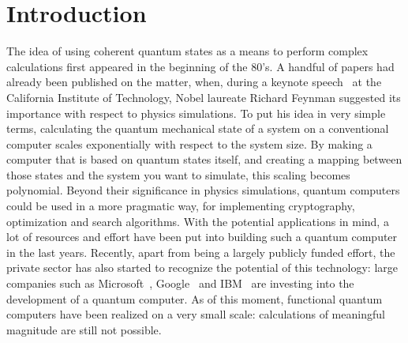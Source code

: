 \chapter{Introduction}

	The idea of using coherent quantum states as a means to perform complex calculations first appeared in the beginning of the 80's.
	A handful of papers had already been published on the matter, when, during a keynote speech~\cite{feynman_simulating_1982} at the California Institute of Technology, Nobel laureate Richard Feynman suggested its importance with respect to physics simulations.
	To put his idea in very simple terms, calculating the quantum mechanical state of a system on a conventional computer scales exponentially with respect to the system size.
	By making a computer that is based on quantum states itself, and creating a mapping between those states and the system you want to simulate, this scaling becomes polynomial.
	Beyond their significance in physics simulations, quantum computers could be used in a more pragmatic way, for implementing cryptography, optimization and search algorithms.
	With the potential applications in mind, a lot of resources and effort have been put into building such a quantum computer in the last years.
	Recently, apart from being a largely publicly funded effort, the private sector has also started to recognize the potential of this technology: large companies such as Microsoft~\cite{noauthor_why_nodate}, Google~\cite{noauthor_quantum_nodate} and IBM~\cite{noauthor_ibm_2018} are investing into the development of a quantum computer.
	As of this moment, functional quantum computers have been realized on a very small scale: calculations of meaningful magnitude are still not possible.

